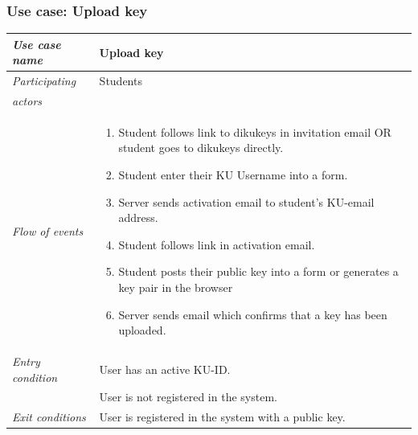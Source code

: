\documentclass[11pt,a4paper]{report}
\begin{document}
\subsubsection{Use case: Upload key}
\begin{tabular}{l p{}}
    \toprule
    \textit{Use case name} & Upload key \\
    \midrule
    \textit{Participating} & Students \\
    \textit{actors} & \\
    \midrule
    \textit{Flow of events} &
    \vspace{-6.7mm} \begin{enumerate}
        \item Student follows link to dikukeys in invitation email OR student goes to dikukeys directly.
        \item Student enter their KU Username into a form.
        \item Server sends activation email to student's KU-email address.
        \item Student follows link in activation email.
        \item Student posts their public key into a form or generates a key pair in the browser
        \item Server sends email which confirms that a key has been uploaded.
    \end{enumerate}
    \\
    \midrule
    \textit{Entry condition} & User has an active KU-ID. \\
                             & User is not registered in the system. \\
    \midrule
    \textit{Exit conditions} & User is registered in the system with a public key. \\
    \bottomrule
\end{tabular}
\end{document}
